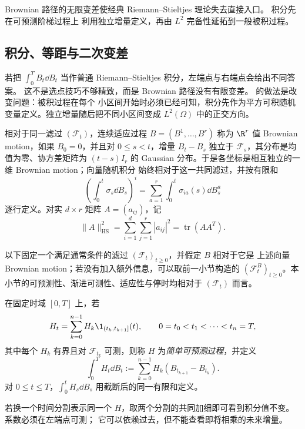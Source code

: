 Brownian 路径的无限变差使经典 Riemann--Stieltjes 理论失去直接入口。\Ito{} 积分先在可预测阶梯过程上
利用独立增量定义，再由 $L^2$ 完备性延拓到一般被积过程。


\subsection{\Ito{} 积分、等距与二次变差}\label{subsec:6-4-2}

若把 $\int_0^TB_t\dd B_t$ 当作普通 Riemann--Stieltjes 积分，左端点与右端点会给出不同答案。
这不是选点技巧不够精致，而是 Brownian 路径没有有限变差。\Ito{} 的做法是改变问题：被积过程在每个
小区间开始时必须已经可知，积分先作为平方可积随机变量定义。独立增量随后把不同小区间变成
$L^2(\Omega)$ 中的正交方向。

\begin{definition}
\label{def:6-4-2-vector-brownian}
相对于同一滤过 $(\mathcal F_t)$，连续适应过程
$B=(B^1,\ldots,B^r)$ 称为 $\R^r$ 值 Brownian motion，如果 $B_0=0$，并且对
$0\le s<t$，增量 $B_t-B_s$ 独立于 $\mathcal F_s$，其分布是均值为零、协方差矩阵为
$(t-s)I_r$ 的 Gaussian 分布。于是各坐标是相互独立的一维 Brownian motion；向量随机积分
始终相对于这一共同滤过，并按有限和
\[
 \left(\int_0^t\sigma_s\dd B_s\right)^i
 =\sum_{a=1}^r\int_0^t\sigma_{ia}(s)\dd B_s^a
\]
逐行定义。对实 $d\times r$ 矩阵 $A=(a_{ij})$，记
\[
 \|A\|_{\mathrm{HS}}^2=\sum_{i=1}^d\sum_{j=1}^r|a_{ij}|^2
 =\operatorname{tr}(AA^T).
\]
\end{definition}

以下固定一个满足通常条件的滤过 $(\mathcal F_t)_{t\ge0}$，并假定 $B$ 相对于它是
上述向量 Brownian motion；若没有加入额外信息，可以取前一小节构造的
$(\mathcal F_t^B)_{t\ge0}$。本小节的可预测性、渐进可测性、适应性与停时均相对于
$(\mathcal F_t)$ 而言。

\begin{definition}[简单可预测过程及其积分]\label{def:6-4-2-1}
在固定时域 $[0,T]$ 上，若
\[
 H_t=\sum_{k=0}^{n-1}H_k\1_{(t_k,t_{k+1}]}(t),
 \qquad0=t_0<t_1<\cdots<t_n=T,
\]
其中每个 $H_k$ 有界且对 $\mathcal F_{t_k}$ 可测，则称 $H$ 为\emph{简单可预测过程}，并定义
\[
 \int_0^TH_t\dd B_t
 :=\sum_{k=0}^{n-1}H_k(B_{t_{k+1}}-B_{t_k}).
\]
对 $0\le t\le T$，$\int_0^tH_s\dd B_s$ 用截断后的同一有限和定义。
\end{definition}

若换一个时间分割表示同一个 $H$，取两个分割的共同加细即可看到积分值不变。系数必须在左端点可测；
它可以依赖过去，但不能查看即将相乘的未来增量。

